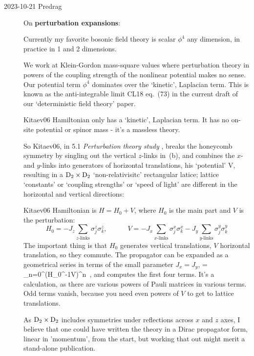 \begin{description}
\item[2023-10-21 Predrag] On {\bf perturbation expansions}:

Currently my favorite bosonic field theory is scalar $\phi^4$ any
dimension, in practice in 1 and 2 dimensions.

We work at Klein-Gordon mass-square values where perturbation theory
in powers of the coupling strength of the nonlinear potential makes
no sense.  Our
potential term $\phi^4$ dominates over the `kinetic', Laplacian term.
This is known as the
anti-integrable limit
{CL18 eq.~(73)}
in the current draft of our `deterministic field theory' paper.

Kitaev06 Hamiltonian  only has a `kinetic',
Laplacian term. It has no on-site potential
or spinor mass - it's a massless theory.

So Kitaev06, in
{5.1 {\em Perturbation theory study} }, breaks
the honeycomb  symmetry by singling out the vertical
$z$-links in
\,(b),
and combines the $x$- and $y$-links into generators of horizontal
translations, his `potential' V, resulting in a $\textrm{D}_{2}\times\textrm{D}_{2}$
`non-relativisitc'
rectangular latice; lattice `constants'
or `coupling strengths' or `speed of light'
are different in the horizontal and vertical directions:

Kitaev06 Hamiltonian is $H=H_{0}+V$, where $H_{0}$ is the main part and $V$ is the
perturbation:
\[
H_{0} = -J_{z} \sum_{\text{$z$-links}} \sigma_{j}^{z}\sigma_{k}^{z},
\qquad\quad
V = -J_{x} \sum_{\text{$x$-links}} \sigma_{j}^{x}\sigma_{k}^{x}
-J_{y} \sum_{\text{$y$-links}} \sigma_{j}^{y}\sigma_{k}^{y}
\]
The important thing is that $H_0$ generates vertical translations, $V$
horizontal translation, so they commute. The propagator can be expanded
as a geometrical series in terms of the small parameter $J_{x}=J_{y}$,
\beq
{} =
 \sum_{n=0}^{\infty}\left({H_{0}^{-1}{V}}\right)^n
\,,
and computes the first four terms. It's a calculation, as there are
various powers of Pauli matrices in various terms.  Odd terms vanish,
because you need even powers of $V$ to get to lattice translations.

As $\textrm{D}_{2}\times\textrm{D}_{2}$ includes symmetries under reflections across $x$
and $z$ axes, I believe that one could have written the theory in a Dirac
propagator form, linear in 'momentum', from the start, but working that
out might merit a stand-alone publication.


\end{description}
